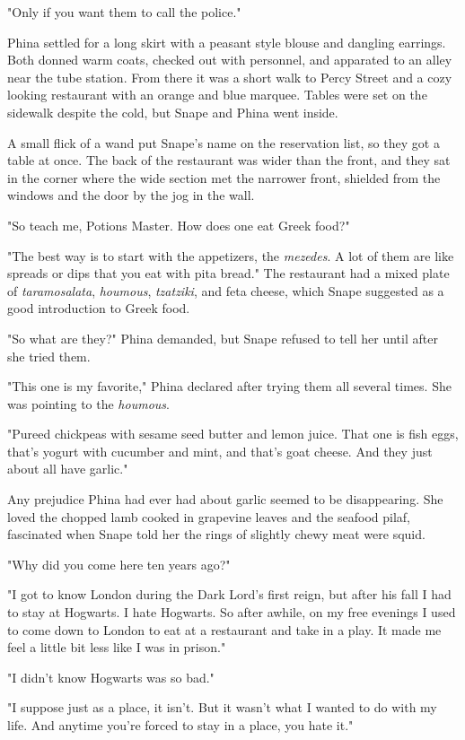 "Only if you want them to call the police."

Phina settled for a long skirt with a peasant style blouse and dangling earrings. Both donned warm coats, checked out with personnel, and apparated to an alley near the tube station. From there it was a short walk to Percy Street and a cozy looking restaurant with an orange and blue marquee. Tables were set on the sidewalk despite the cold, but Snape and Phina went inside.

A small flick of a wand put Snape's name on the reservation list, so they got a table at once. The back of the restaurant was wider than the front, and they sat in the corner where the wide section met the narrower front, shielded from the windows and the door by the jog in the wall.

"So teach me, Potions Master. How does one eat Greek food?"

"The best way is to start with the appetizers, the \emph{mezedes}. A lot of them are like spreads or dips that you eat with pita bread." The restaurant had a mixed plate of \emph{taramosalata}, \emph{houmous}, \emph{tzatziki}, and feta cheese, which Snape suggested as a good introduction to Greek food.

"So what are they?" Phina demanded, but Snape refused to tell her until after she tried them.

"This one is my favorite," Phina declared after trying them all several times. She was pointing to the \emph{houmous}.

"Pureed chickpeas with sesame seed butter and lemon juice. That one is fish eggs, that's yogurt with cucumber and mint, and that's goat cheese. And they just about all have garlic."

Any prejudice Phina had ever had about garlic seemed to be disappearing. She loved the chopped lamb cooked in grapevine leaves and the seafood pilaf, fascinated when Snape told her the rings of slightly chewy meat were squid.

"Why did you come here ten years ago?"

"I got to know London during the Dark Lord's first reign, but after his fall I had to stay at Hogwarts. I hate Hogwarts. So after awhile, on my free evenings I used to come down to London to eat at a restaurant and take in a play. It made me feel a little bit less like I was in prison."

"I didn't know Hogwarts was so bad."

"I suppose just as a place, it isn't. But it wasn't what I wanted to do with my life. And anytime you're forced to stay in a place, you hate it."

